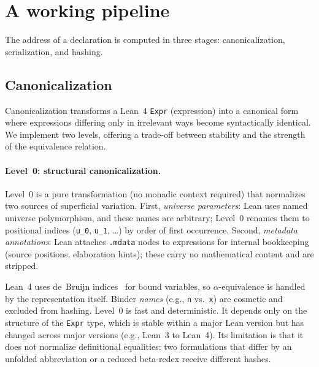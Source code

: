 \section{A working pipeline}
\label{sec:pipeline}

The address of a declaration is computed in three stages:
canonicalization, serialization, and hashing.

\subsection{Canonicalization}
\label{sec:canon}

Canonicalization transforms a Lean~4 \texttt{Expr} (expression) into a
canonical form where expressions differing only in irrelevant ways
become syntactically identical.  We implement two levels, offering a
trade-off between stability and the strength of the equivalence
relation.

\paragraph{Level~0: structural canonicalization.}
Level~0 is a pure transformation (no monadic context required) that
normalizes two sources of superficial variation.  First, \emph{universe
parameters}: Lean uses named universe polymorphism, and these names are
arbitrary; Level~0 renames them to positional indices (\texttt{u\_0},
\texttt{u\_1}, \ldots) by order of first occurrence.  Second,
\emph{metadata annotations}: Lean attaches \texttt{.mdata} nodes to
expressions for internal bookkeeping (source positions, elaboration
hints); these carry no mathematical content and are stripped.

Lean~4 uses de~Bruijn indices~\cite{debruijn1972} for bound variables,
so $\alpha$-equivalence is handled by the representation itself.
Binder \emph{names} (e.g., \texttt{n} vs.\ \texttt{x}) are cosmetic
and excluded from hashing.  Level~0 is fast and deterministic.  It
depends only on the structure of the \texttt{Expr} type, which is
stable within a major Lean version but has changed across major versions
(e.g., Lean~3 to Lean~4).  Its limitation is that it does not normalize
definitional equalities: two formulations that differ by an unfolded
abbreviation or a reduced beta-redex receive different hashes.

